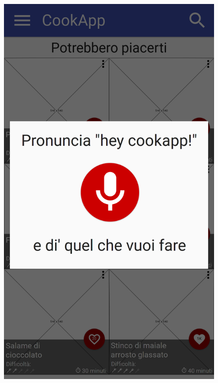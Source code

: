 \begin{figure}[H]
	\begin{minipage}{.49\textwidth}
		\includegraphics[width=\textwidth]{img/wireframe/homepage_start_audio.png}
	\end{minipage}
	\begin{minipage}{.49\textwidth}

\end{minipage}
\end{figure}
